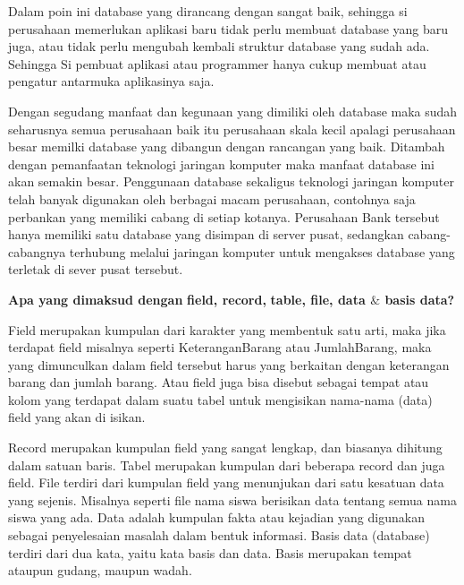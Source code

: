 \documentclass{wileySix}
\begin{document}
\par
Dalam poin ini database yang dirancang dengan sangat baik, sehingga si perusahaan memerlukan aplikasi baru tidak perlu membuat database yang baru juga, atau tidak perlu mengubah kembali struktur database yang sudah ada. Sehingga Si pembuat aplikasi atau programmer hanya cukup membuat atau pengatur antarmuka aplikasinya saja. \par
\vspace{12pt}
Dengan segudang manfaat dan kegunaan yang dimiliki oleh database maka sudah seharusnya semua perusahaan baik itu perusahaan skala kecil apalagi perusahaan besar memilki database yang dibangun dengan rancangan yang baik. Ditambah dengan pemanfaatan teknologi jaringan komputer maka manfaat database ini akan semakin besar. Penggunaan database sekaligus teknologi jaringan komputer telah banyak digunakan oleh berbagai macam perusahaan, contohnya saja perbankan yang memiliki cabang di setiap kotanya. Perusahaan Bank tersebut hanya memiliki satu database yang disimpan di server pusat, sedangkan cabang-cabangnya terhubung melalui jaringan komputer untuk mengakses database yang terletak di sever pusat tersebut. \par
\vspace{12pt}
\vspace{12pt}
\vspace{12pt}
\noindent 
\textbf{Apa yang dimaksud dengan}\textbf{ field, record, }\textbf{table, file, data  $  \&  $ basis data?} \par
Field merupakan kumpulan dari karakter yang membentuk satu arti, maka jika terdapat field misalnya seperti KeteranganBarang atau JumlahBarang, maka yang dimunculkan dalam field tersebut harus yang berkaitan dengan keterangan barang dan jumlah barang. Atau field juga bisa disebut sebagai tempat atau kolom yang terdapat dalam suatu tabel untuk mengisikan nama-nama (data) field yang akan di isikan. \par
\vspace{12pt}
Record merupakan kumpulan field yang sangat lengkap, dan biasanya dihitung dalam satuan baris. Tabel merupakan kumpulan dari beberapa record dan juga field. File terdiri dari kumpulan field yang menunjukan dari satu kesatuan data yang sejenis. Misalnya seperti file nama siswa berisikan data tentang semua nama siswa yang ada. Data adalah kumpulan fakta atau kejadian yang digunakan sebagai penyelesaian masalah dalam bentuk informasi. Basis data (database) terdiri dari dua kata, yaitu kata basis dan data. Basis merupakan tempat ataupun gudang, maupun wadah. \par
\end{document}
